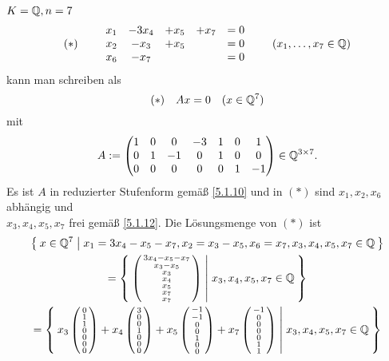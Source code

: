 \documentclass[../../main.tex]{subfiles}
\begin{document}
\begin{bsp}\label{5.1.13}
$K=\mathbb Q, n=7$
$$(*)\qquad \begin{array}{ccccc}
x_1 & -3x_4 & +x_5 & +x_7 & = 0\\
x_2 & -x_3 & +x_5 & & = 0\\
x_6 & - x_7 & & & = 0
\end{array}\qquad(x_1,\ldots,x_7 \in \mathbb Q)$$
kann man schreiben als \[(*)\quad Ax = 0\quad (x\in \mathbb Q^7)\]
mit 
$$A:=\begin{pmatrix}
1 & 0 & 0 & -3 & 1 & 0 & 1\\
0 & 1 & -1 & 0 & 1 & 0 & 0\\
0 & 0 & 0 & 0 & 0 & 1 & -1
\end{pmatrix}\in \mathbb Q^{3\times 7}.$$
Es ist $A$ in reduzierter Stufenform gemäß \ref{5.1.10} und in $(*)$ sind $x_1, x_2, x_6$ abhängig und\\
$x_3, x_4,x_5,x_7$ frei gemäß \ref{5.1.12}. Die Lösungsmenge von $(*)$ ist
\begin{multline*}
\Set{x\in\Q^7 | x_1=3x_4-x_5-x_7, x_2=x_3-x_5, x_6 = x_7, x_3,x_4,x_5,x_7\in \Q}\\
=\Set{\cvec{3x_4-x_5-x_7\\ x_3-x_5\\x_3\\x_4\\x_5\\x_7\\x_7}| x_3,x_4,x_5,x_7\in \Q}\\
=\Set{x_3\cvec{0\\1\\1\\0\\0\\0\\0}+x_4\cvec{3\\0\\0\\1\\0\\0\\0}+x_5\cvec{-1\\-1\\0\\0\\1\\0\\0}+x_7\cvec{-1\\0\\0\\0\\0\\1\\1} | x_3,x_4,x_5,x_7\in \Q}\\

\end{multline*}
\end{bsp}
\end{document}

